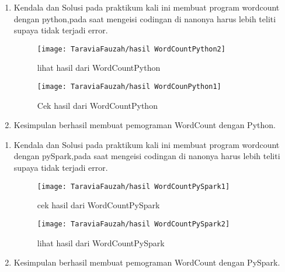 \begin{enumerate}
\item Kendala dan Solusi
\newline pada praktikum kali ini membuat program wordcount dengan python,pada saat mengeisi codingan di nanonya harus lebih teliti supaya tidak terjadi error.

\newpage
\begin{figure}[!ht]
\texttt{[image: TaraviaFauzah/hasil WordCountPython2]}
\caption{lihat hasil dari WordCountPython }
\label{gam:perkuliahan2-15}
\end{figure}

\begin{figure}[!ht]
\texttt{[image: TaraviaFauzah/hasil WordCounPython1]}
\caption{Cek hasil dari WordCountPython }
\label{gam:perkuliahan2-15}
\end{figure}

\item Kesimpulan
\newline berhasil membuat pemograman WordCount dengan Python.
\end{enumerate}

\begin{enumerate}
\item Kendala dan Solusi
\newline pada praktikum kali ini membuat program wordcount dengan pySpark,pada saat mengeisi codingan di nanonya harus lebih teliti supaya tidak terjadi error.

\begin{figure}[!ht]
\texttt{[image: TaraviaFauzah/hasil WordCountPySpark1]}
\caption{cek hasil dari WordCountPySpark }
\label{gam:perkuliahan2-15}
\end{figure}

\newpage
\begin{figure}[!ht]
\texttt{[image: TaraviaFauzah/hasil WordCountPySpark2]}
\caption{lihat hasil dari WordCountPySpark }
\label{gam:perkuliahan2-15}
\end{figure}

\item Kesimpulan
\newline berhasil membuat pemograman WordCount dengan PySpark.
\end{enumerate}

